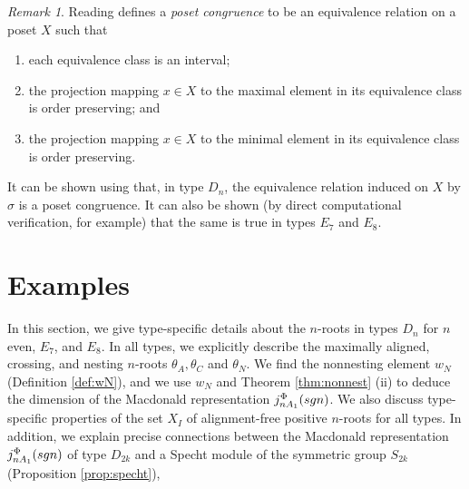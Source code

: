 \documentclass[11pt]{amsart}
\theoremstyle{plain}
\theoremstyle{definition}
\theoremstyle{remark}
\newtheorem{rmk}[theorem]{Remark}
\numberwithin{equation}{subsection}
\newcommand{\macd}[2]{j^{#1}_{#2}({\rm{sgn}})}
\begin{document}
\begin{rmk}\label{rmk:posetcong}
Reading \cite{reading02} defines a {\it poset congruence} to be an equivalence
relation on a poset $X$ such that
\begin{enumerate}
    \item[(i)]{each equivalence class is an interval;}
    \item[(ii)]{the projection mapping $x \in X$ to the maximal element in its
           equivalence class is order preserving; and}
       \item[(iii)]{the projection mapping $x \in X$ to the minimal element in
        its equivalence class is order preserving.}
\end{enumerate} It can be shown using \cite[Proposition 42]{watson14} that, in
    type $D_n$, the equivalence relation induced on $X$ by $\sigma$ is a poset
    congruence.  It can also be shown (by direct computational verification, for
    example) that the same is true in types $E_7$ and $E_8$.
\end{rmk}



\section{Examples}\label{sec:examples}
In this section, we give type-specific details about the $n$-roots in types
$D_n$ for $n$ even, $E_7$, and $E_8$.  In all types, we explicitly describe the
maximally aligned, crossing, and nesting $n$-roots $\theta_A, \theta_C$ and
$\theta_N$. We find the nonnesting element $w_N$ (Definition \ref{def:wN}), and
we use $w_N$ and Theorem
\ref{thm:nonnest} (ii) to deduce the dimension of the Macdonald representation
$\macd{\Phi}{nA_1}$. We also discuss type-specific properties of the set $X_I$
of alignment-free positive $n$-roots for all types. In addition, we explain
precise connections between the Macdonald representation $\macd{\Phi}{nA_1}$ of
type $D_{2k}$ and a Specht module of the symmetric group $S_{2k}$ (Proposition
\ref{prop:specht}),
\end{document}

